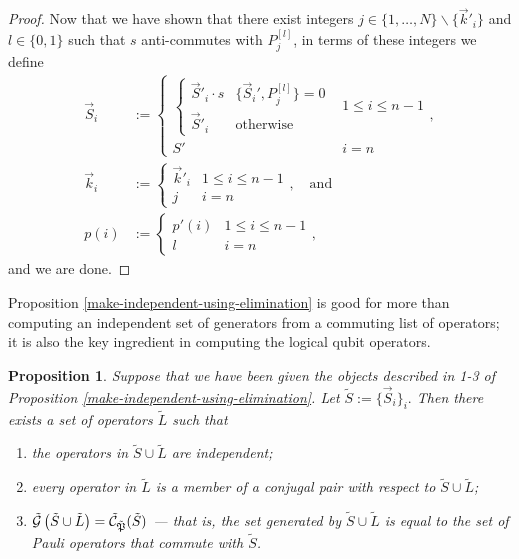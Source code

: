 \documentclass[twocolumn,showpacs,preprintnumbers,amsmath,amssymb,nofootinbib,pra,floatfix]{revtex4-1}
\newtheorem{proposition}{Proposition}
\newenvironment{remark}[1][Remark]{\begin{trivlist}
\item[\hskip \labelsep {\bfseries #1}]}{\end{trivlist}}
\newcommand{\lst}{\vec}
\newcommand{\set}{\tilde}
\newcommand{\genfun}{\tilde{\mathcal{G}}}
\newcommand{\pauligroup}{{\set{\mathfrak{P}}}}
\newcommand{\centralizer}{\set{\mathcal{C}}}
\begin{document}
\begin{proof}
Now that we have shown that there exist integers $j\in\{1,\dots,N\}\backslash\{\lst k'_i\}$ and $l\in\{0,1\}$ such that $s$ anti-commutes with $P_{j}^{[l]}$, in terms of these integers we define
$$
\begin{aligned}
\lst S_i &:= 
\begin{cases}
\begin{cases}
\lst S'_i \cdot s & \{\lst S_i',P_j^{[l]}\}=0 \\
\lst S'_i & \text{otherwise}
\end{cases} & 1\le i\le n-1 \\
S' & i=n
\end{cases}, \\
\lst k_i &:=
\begin{cases}
\lst k'_i & 1 \le i \le n-1 \\
j & i=n
\end{cases},\quad \text{and} \\
p(i) &:=
\begin{cases}
p'(i) & 1 \le i \le n-1\\
l & i=n
\end{cases},
\end{aligned}
$$ and we are done.
\end{proof}
\begin{remark}
Proposition \ref{make-independent-using-elimination} is good for more than computing an independent set of generators from a commuting list of operators;  it is also the key ingredient in computing the logical qubit operators.
\end{remark}

\begin{proposition}
\label{construction-of-logicals}
Suppose that we have been given the objects described in 1-3 of Proposition \ref{make-independent-using-elimination}.  Let $\set S := \{\vec S_i\}_i.$  Then there exists a set of operators $\set L$ such that
\begin{enumerate}
\item \label{L-are-independent} the operators in $\set S\cup\set L$ are independent;
\item \label{L-are-conjugal-pairs} every operator in $\set L$ is a member of a conjugal pair with respect to $\set S\cup\set L$;
\item \label{L-completes-the-generators} $\genfun\paren{\set S\cup\set L}=\centralizer_\pauligroup(\set S)$ --- that is, the set generated by $\set S\cup\set L$ is equal to the set of Pauli operators that commute with $\set S$.
\end{enumerate}
\end{proposition}
\end{document}

